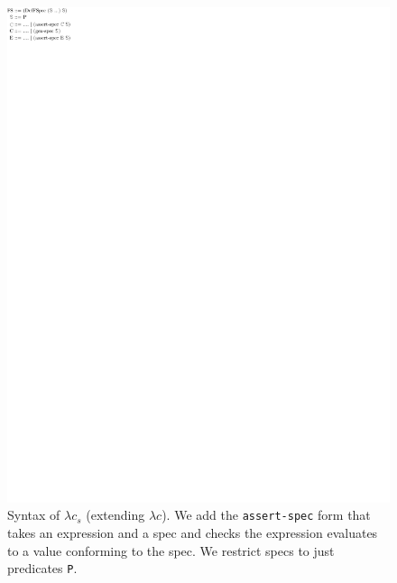\begin{figure}
  \includegraphics[]{redex/clojurespec-grammar.pdf}
\caption{Syntax of $\lambda c_s$ (extending $\lambda c$).
  We add the \texttt{assert-spec} form that takes an expression and a spec
  and checks the expression evaluates to a value conforming to the spec.
  We restrict specs to just predicates \texttt{P}.}
\end{figure}

